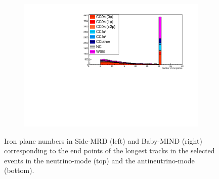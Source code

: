 \begin{figure}[tbh]
\begin{center}
\begin{subfigure}{0.48\textwidth}
    \end{subfigure}
  \begin{subfigure}{0.48\textwidth}
    \includegraphics[width=0.55\linewidth, angle=270]{fig/RHCMuonPenetration_DownstreamMRD_StoppedOrThroughGoing.pdf}
    \end{subfigure}    
    \end{center}
  \caption{
Iron plane numbers in Side-MRD (left) and Baby-MIND (right) corresponding to the end points of the longest tracks in the selected events in the neutrino-mode (top) and the antineutrino-mode (bottom).
}
\label{fig:fig:endpoint_longest_track}
\end{figure}



%


